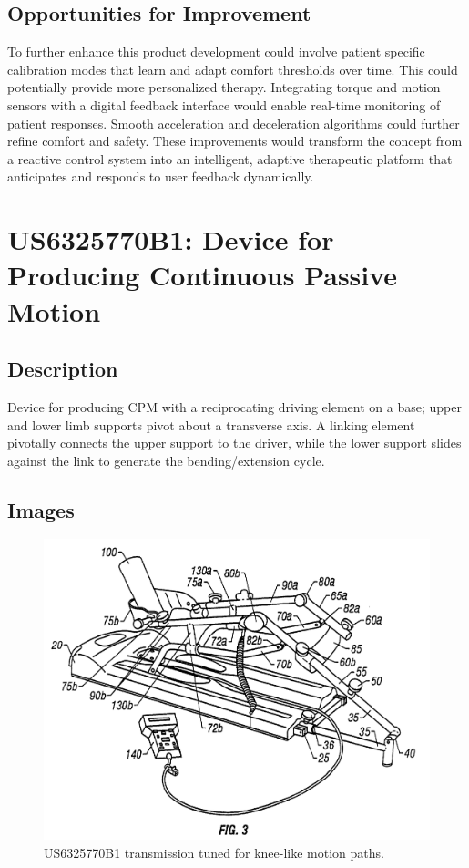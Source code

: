 \documentclass[11pt]{article}
\begin{document}
\subsection{Opportunities for Improvement}
To further enhance this product development could involve patient specific calibration modes that learn and adapt comfort thresholds over time. This could potentially provide more personalized therapy. Integrating torque and motion sensors with a digital feedback interface would enable real-time monitoring of patient responses. Smooth acceleration and deceleration algorithms could further refine comfort and safety. These improvements would transform the concept from a reactive control system into an intelligent, adaptive therapeutic platform that anticipates and responds to user feedback dynamically.

\section{US6325770B1: Device for Producing Continuous Passive Motion}
\subsection{Description}
Device for producing CPM with a reciprocating driving element on a base; upper and lower limb supports pivot about a transverse axis. A linking element pivotally connects the upper support to the driver, while the lower support slides against the link to generate the bending/extension cycle.
\subsection{Images}
\begin{figure}[H]
  \centering
  \includegraphics[width=0.54\linewidth]{US6325770B1_1.png}
  \caption{US6325770B1 transmission tuned for knee-like motion paths.}
  \label{fig:US6325770B1}
\end{figure}
\end{document}
